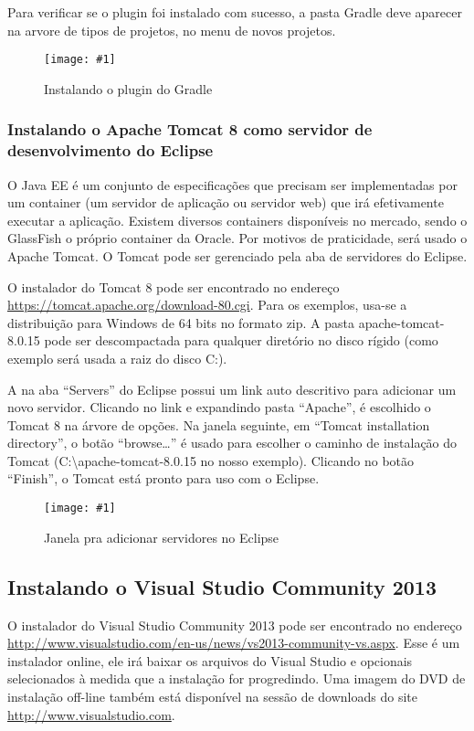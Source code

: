 \documentclass[a4paper,12pt]{article}
\newcommand{\figura}[2] {
	\begin{figure}[ht]
		\centering
		\texttt{[image: \#1]}
		\caption{#2}
	\end{figure}
	\FloatBarrier
}
\begin{document}
Para verificar se o plugin foi instalado com sucesso, a pasta Gradle deve aparecer na arvore de tipos de projetos, no menu de novos projetos.

\figura{plugin1.png}{Instalando o plugin do Gradle}

\subsubsection{Instalando o Apache Tomcat 8 como servidor de desenvolvimento do Eclipse} 

O Java EE é um conjunto de especificações que precisam ser implementadas por um container (um servidor de aplicação ou servidor web) que irá efetivamente executar a aplicação. Existem diversos containers disponíveis no mercado, sendo o GlassFish o próprio container da Oracle. Por motivos de praticidade, será usado o Apache Tomcat. O Tomcat pode ser gerenciado pela aba de servidores do Eclipse.

O instalador do Tomcat 8 pode ser encontrado no endereço \url{https://tomcat.apache.org/download-80.cgi}. Para os exemplos, usa-se a distribuição para Windows de 64 bits no formato zip. A pasta apache-tomcat-8.0.15 pode ser descompactada para qualquer diretório no disco rígido (como exemplo será usada a raiz do disco C:). 

A na aba “Servers” do Eclipse possui um link auto descritivo para adicionar um novo servidor. Clicando no link e expandindo pasta “Apache”, é escolhido o Tomcat 8 na árvore de opções. Na janela seguinte, em “Tomcat installation directory”, o botão “browse\ldots” é usado para escolher o caminho de instalação do Tomcat (C:\textbackslash apache-tomcat-\textmd{8.0.15} no nosso exemplo). Clicando no botão “Finish”, o Tomcat está pronto para uso com o Eclipse.

\figura{tomcat1.png}{Janela pra adicionar servidores no Eclipse}

\subsection{Instalando o Visual Studio Community 2013} 

O instalador do Visual Studio Community 2013 pode ser encontrado no endereço \url{http://www.visualstudio.com/en-us/news/vs2013-community-vs.aspx}. Esse é um instalador online, ele irá baixar os arquivos do Visual Studio e opcionais selecionados à medida que a instalação for progredindo. Uma imagem do DVD de instalação off-line também está disponível na sessão de downloads do site \url{http://www.visualstudio.com}.
\end{document}
